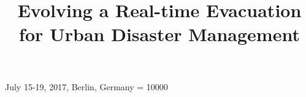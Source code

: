 \documentclass{sig-alternate-05-2015}
\begin{document}
 {July 15-19, 2017, Berlin, Germany}
\widowpenalty = 10000

\title{Evolving a Real-time Evacuation for Urban Disaster Management}

%
%
%
%
%
\end{document}

